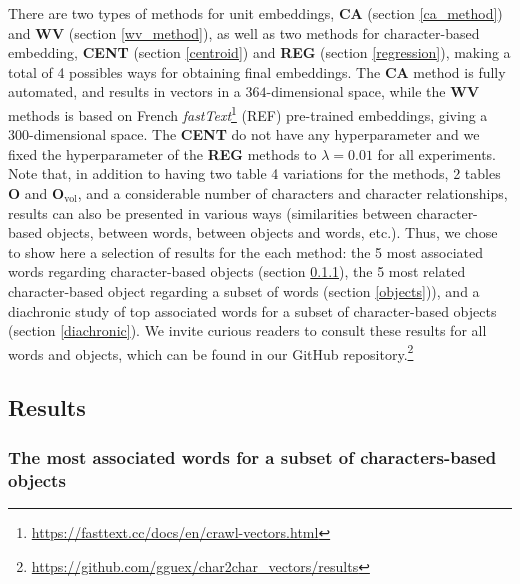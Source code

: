 \documentclass[
twocolumn,
]{ceurart}
\begin{document}
There are two types of methods for unit embeddings, \textbf{CA} (section \ref{ca_method}) and \textbf{WV} (section \ref{wv_method}), as well as two methods for character-based embedding, \textbf{CENT} (section \ref{centroid}) and \textbf{REG} (section \ref{regression}), making a total of 4 possibles ways for obtaining final embeddings. The \textbf{CA} method is fully automated, and results in vectors in a $364$-dimensional space, while the $\textbf{WV}$ methods is based on French \emph{fastText}\footnote{\url{https://fasttext.cc/docs/en/crawl-vectors.html}} (REF) pre-trained embeddings, giving a $300$-dimensional space. The \textbf{CENT} do not have any hyperparameter and we fixed the hyperparameter of the \textbf{REG} methods to $\lambda = 0.01$ for all experiments. \\
Note that, in addition to having two table 4 variations for the methods, 2 tables $\mathbf{O}$ and $\mathbf{O}_\text{vol}$, and a considerable number of characters and character relationships, results can also be presented in various ways (similarities between character-based objects, between words, between objects and words, etc.). Thus, we chose to show here a selection of results for the each method: the 5 most associated words regarding character-based objects (section \ref{words}), the 5 most related character-based object regarding a subset of words (section \ref{objects})), and a diachronic study of top associated words for a subset of character-based objects (section \ref{diachronic}). We invite curious readers to consult these results for all words and objects, which can be found in our GitHub repository.\footnote{\url{https://github.com/gguex/char2char_vectors/results}}

\subsection{Results}

\subsubsection{The most associated words for a subset of characters-based objects}
\label{words}

\end{document}
